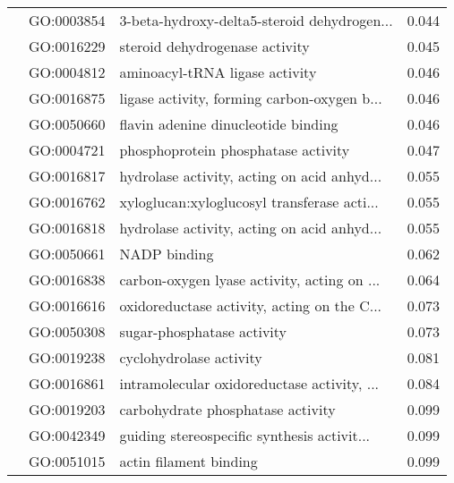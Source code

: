 \begin{longtable}{lllr}
   & GO:0003854 &  3-beta-hydroxy-delta5-steroid dehydrogen... &         0.044 \\
   & GO:0016229 &               steroid dehydrogenase activity &         0.045 \\
   & GO:0004812 &               aminoacyl-tRNA ligase activity &         0.046 \\
   & GO:0016875 &  ligase activity, forming carbon-oxygen b... &         0.046 \\
   & GO:0050660 &          flavin adenine dinucleotide binding &         0.046 \\
   & GO:0004721 &          phosphoprotein phosphatase activity &         0.047 \\
   & GO:0016817 &  hydrolase activity, acting on acid anhyd... &         0.055 \\
   & GO:0016762 &  xyloglucan:xyloglucosyl transferase acti... &         0.055 \\
   & GO:0016818 &  hydrolase activity, acting on acid anhyd... &         0.055 \\
   & GO:0050661 &                                 NADP binding &         0.062 \\
   & GO:0016838 &  carbon-oxygen lyase activity, acting on ... &         0.064 \\
   & GO:0016616 &  oxidoreductase activity, acting on the C... &         0.073 \\
   & GO:0050308 &                   sugar-phosphatase activity &         0.073 \\
   & GO:0019238 &                      cyclohydrolase activity &         0.081 \\
   & GO:0016861 &  intramolecular oxidoreductase activity, ... &         0.084 \\
   & GO:0019203 &            carbohydrate phosphatase activity &         0.099 \\
   & GO:0042349 &  guiding stereospecific synthesis activit... &         0.099 \\
   & GO:0051015 &                       actin filament binding &         0.099 \\
\end{longtable}
